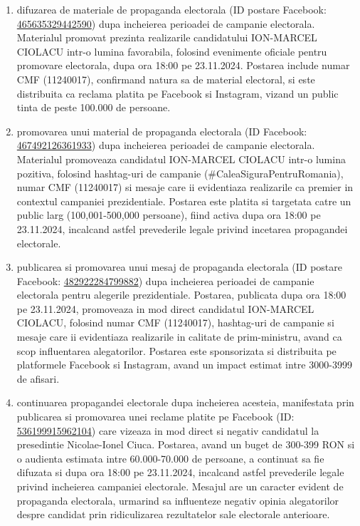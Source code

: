 \documentclass[a4paper,12pt]{article}
\begin{document}
\begin{enumerate}[leftmargin=*, label=\arabic*.)]
    \item difuzarea de materiale de propaganda electorala (ID postare Facebook: \href{https://www.facebook.com/ads/library/?id=465635329442590}{465635329442590}) dupa incheierea perioadei de campanie electorala. Materialul promovat prezinta realizarile candidatului ION-MARCEL CIOLACU intr-o lumina favorabila, folosind evenimente oficiale pentru promovare electorala, dupa ora 18:00 pe 23.11.2024. Postarea include numar CMF (11240017), confirmand natura sa de material electoral, si este distribuita ca reclama platita pe Facebook si Instagram, vizand un public tinta de peste 100.000 de persoane.
    \item promovarea unui material de propaganda electorala (ID Facebook: \href{https://www.facebook.com/ads/library/?id=467492126361933}{467492126361933}) dupa incheierea perioadei de campanie electorala. Materialul promoveaza candidatul ION-MARCEL CIOLACU intr-o lumina pozitiva, folosind hashtag-uri de campanie (\#CaleaSiguraPentruRomania), numar CMF (11240017) si mesaje care ii evidentiaza realizarile ca premier in contextul campaniei prezidentiale. Postarea este platita si targetata catre un public larg (100,001-500,000 persoane), fiind activa dupa ora 18:00 pe 23.11.2024, incalcand astfel prevederile legale privind incetarea propagandei electorale.
    \item publicarea si promovarea unui mesaj de propaganda electorala (ID postare Facebook: \href{https://www.facebook.com/ads/library/?id=482922284799882}{482922284799882}) dupa incheierea perioadei de campanie electorala pentru alegerile prezidentiale. Postarea, publicata dupa ora 18:00 pe 23.11.2024, promoveaza in mod direct candidatul ION-MARCEL CIOLACU, folosind numar CMF (11240017), hashtag-uri de campanie si mesaje care ii evidentiaza realizarile in calitate de prim-ministru, avand ca scop influentarea alegatorilor. Postarea este sponsorizata si distribuita pe platformele Facebook si Instagram, avand un impact estimat intre 3000-3999 de afisari.
    \item continuarea propagandei electorale dupa incheierea acesteia, manifestata prin publicarea si promovarea unei reclame platite pe Facebook (ID: \href{https://www.facebook.com/ads/library/?id=536199915962104}{536199915962104}) care vizeaza in mod direct si negativ candidatul la presedintie Nicolae-Ionel Ciuca. Postarea, avand un buget de 300-399 RON si o audienta estimata intre 60.000-70.000 de persoane, a continuat sa fie difuzata si dupa ora 18:00 pe 23.11.2024, incalcand astfel prevederile legale privind incheierea campaniei electorale. Mesajul are un caracter evident de propaganda electorala, urmarind sa influenteze negativ opinia alegatorilor despre candidat prin ridiculizarea rezultatelor sale electorale anterioare.

\end{enumerate}
\end{document}

